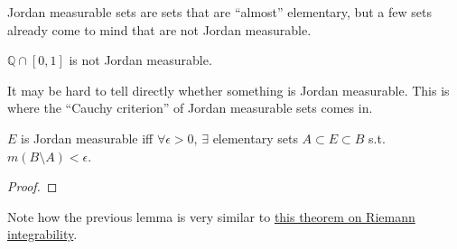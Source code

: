   Jordan measurable sets are sets that are ``almost'' elementary, but a few sets already come to mind that are not Jordan measurable. 

  \begin{example}
    $\mathbb{Q} \cap [0, 1]$ is not Jordan measurable. 
  \end{example} 

  It may be hard to tell directly whether something is Jordan measurable. This is where the ``Cauchy criterion'' of Jordan measurable sets comes in. 

  \begin{theorem}
    $E$ is Jordan measurable iff $\forall \epsilon > 0$, $\exists$ elementary sets $A \subset E \subset B$ s.t. $m(B \setminus A) < \epsilon$. 
  \end{theorem}
  \begin{proof}
    
  \end{proof}

  Note how the previous lemma is very similar to \hyperref[real-thm:cauchy-riemann-integrability]{this theorem on Riemann integrability}. 

  \begin{example}
    
  \end{example}

  \begin{example}
    
  \end{example}

  \begin{example}
    
  \end{example}

  \begin{example}
    
  \end{example}

  \begin{example}
    
  \end{example}

  \begin{theorem}
    
  \end{theorem}


